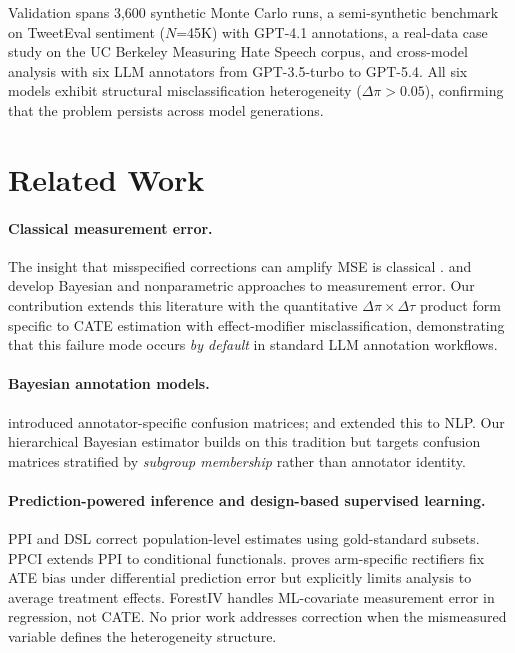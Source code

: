 \documentclass[11pt,a4paper]{article}
\newcommand{\DeltaPi}{\Delta\pi}
\newcommand{\DeltaTau}{\Delta\tau}
\begin{document}
Validation spans 3{,}600 synthetic Monte Carlo runs, a semi-synthetic benchmark on TweetEval sentiment ($N$=45K) with GPT-4.1 annotations, a real-data case study on the UC Berkeley Measuring Hate Speech corpus, and cross-model analysis with six LLM annotators from GPT-3.5-turbo to GPT-5.4.
All six models exhibit structural misclassification heterogeneity ($\DeltaPi > 0.05$), confirming that the problem persists across model generations.


\section{Related Work}

\paragraph{Classical measurement error.}
The insight that misspecified corrections can amplify MSE is classical \citep{fuller1987measurement,carroll2006measurement}.
\citet{gustafson2003measurement} and \citet{hu2008instrumental} develop Bayesian and nonparametric approaches to measurement error.
Our contribution extends this literature with the quantitative $\DeltaPi \times \DeltaTau$ product form specific to CATE estimation with effect-modifier misclassification, demonstrating that this failure mode occurs \emph{by default} in standard LLM annotation workflows.

\paragraph{Bayesian annotation models.}
\citet{dawid1979maximum} introduced annotator-specific confusion matrices; \citet{passonneau2014benefits} and \citet{hovy2013learning} extended this to NLP.
Our hierarchical Bayesian estimator builds on this tradition but targets confusion matrices stratified by \emph{subgroup membership} rather than annotator identity.

\paragraph{Prediction-powered inference and design-based supervised learning.}
PPI \citep{angelopoulos2023prediction,angelopoulos2024ppi} and DSL \citep{egami2024using} correct population-level estimates using gold-standard subsets.
PPCI \citep{sui2026prediction} extends PPI to conditional functionals.
\citet{mozer2026using} proves arm-specific rectifiers fix ATE bias under differential prediction error but explicitly limits analysis to average treatment effects.
ForestIV \citep{bu2023estimating} handles ML-covariate measurement error in regression, not CATE.
No prior work addresses correction when the mismeasured variable defines the heterogeneity structure.
\end{document}
